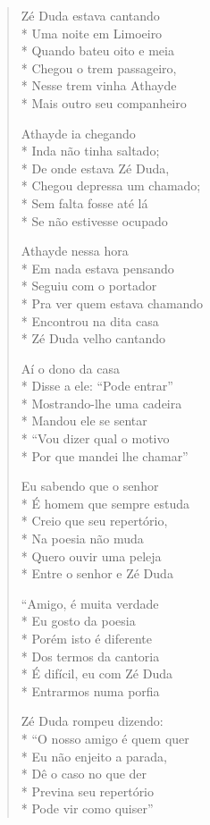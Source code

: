 \begin{verse}

Zé Duda estava cantando\\*
Uma noite em Limoeiro\\*
Quando bateu oito e meia\\*
Chegou o trem passageiro,\\*
Nesse trem vinha Athayde\\*
Mais outro seu companheiro

Athayde ia chegando\\*
Inda não tinha saltado;\\*
De onde estava Zé Duda,\\*
Chegou depressa um chamado;\\*
Sem falta fosse até lá\\*
Se não estivesse ocupado

Athayde nessa hora\\*
Em nada estava pensando\\*
Seguiu com o portador\\*
Pra ver quem estava chamando\\*
Encontrou na dita casa\\*
Zé Duda velho cantando

Aí o dono da casa\\*
Disse a ele: ``Pode entrar''\\*
Mostrando-lhe uma cadeira\\*
Mandou ele se sentar\\*
``Vou dizer qual o motivo\\*
Por que mandei lhe chamar''

Eu sabendo que o senhor\\*
É homem que sempre estuda\\*
Creio que seu repertório,\\*
Na poesia não muda\\*
Quero ouvir uma peleja\\*
Entre o senhor e Zé Duda

``Amigo, é muita verdade\\*
Eu gosto da poesia\\*
Porém isto é diferente\\*
Dos termos da cantoria\\*
É difícil, eu com Zé Duda\\*
Entrarmos numa porfia

Zé Duda rompeu dizendo:\\*
``O nosso amigo é quem quer\\*
Eu não enjeito a parada,\\*
Dê o caso no que der\\*
Previna seu repertório\\*
Pode vir como quiser''


\end{verse}
